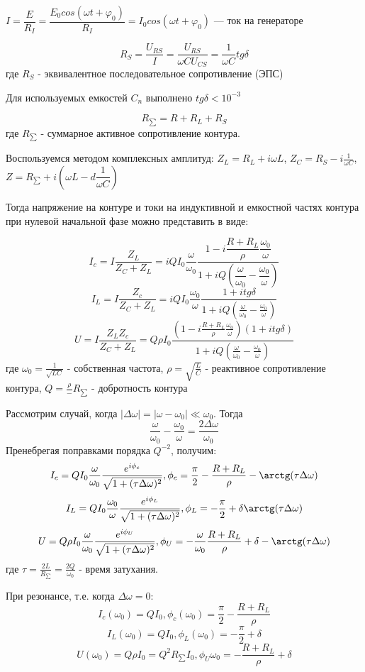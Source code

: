 \documentclass[a4paper, 12pt]{article}
\begin{document}
    $I=\dfrac{E}{R_I}=\dfrac{E_0cos(\omega t+\varphi_0)}{R_I}=I_0cos(\omega t+\varphi_0)$ --- ток на генераторе

    $$R_S=\dfrac{U_{RS}}{I}=\frac{U_{RS}}{\omega CU_{CS}}=\dfrac{1}{\omega C}tg\delta$$
    где $R_S$ - эквивалентное последовательное сопротивление (ЭПС)

    Для используемых емкостей $C_n$ выполнено $tg\delta<10^{-3}$

    $$R_{\sum}=R+R_L+R_S$$
    где $R_{\sum}$ - суммарное активное сопротивление контура.

    Воспользуемся методом комплексных амплитуд:
    $Z_L=R_L+i\omega L$, $Z_C=R_S-i\frac{1}{\omega C}$, $Z=R_{\sum}+i(\omega L-d\dfrac{1}{\omega C})$

    Тогда напряжение на контуре и токи на индуктивной и емкостной частях контура при нулевой начальной фазе можно представить в виде:

    $$I_c=I\dfrac{Z_L}{Z_C+Z_L}=iQI_0\dfrac{\omega}{\omega_0}\dfrac{1-i\dfrac{R+R_L}{\rho}\dfrac{\omega_0}{\omega}}{1+iQ(\dfrac{\omega}{\omega_0}-\dfrac{\omega_0}{\omega})}$$
    $$I_L=I\dfrac{Z_c}{Z_C+Z_L}=iQI_0\frac{\omega_0}{\omega}\frac{1+itg\delta}{1+iQ(\frac{\omega}{\omega_0}-\frac{\omega_0}{\omega})}$$
    $$U=I\frac{Z_LZ_c}{Z_C+Z_L}=Q\rho I_0\frac{(1-i\frac{R+R_L}{\rho}\frac{\omega_0}{\omega})(1+itg\delta)}{1+iQ(\frac{\omega}{\omega_0}-\frac{\omega_0}{\omega})}$$
    где $\omega_0=\frac{1}{\sqrt{LC}}$ - собственная частота, $\rho=\sqrt{\frac{L}{C}}$ - реактивное сопротивление контура, $Q=\frac{\rho} - {R_{\sum}}$ - добротность контура

    Рассмотрим случай, когда $|\Delta\omega|=|\omega-\omega_0|\ll\omega_0$. Тогда $$\frac{\omega}{\omega_0}-\frac{\omega_0}{\omega}=\frac{2\Delta\omega}{\omega_0}$$ Пренебрегая поправками порядка $Q^{-2}$, получим:
    $$I_c=QI_0\frac{\omega}{\omega_0}\frac{e^{i\phi_c}}{\sqrt{1+(\tau\Delta\omega)^2}},    \phi_c=\frac{\pi}{2}-\frac{R+R_L}{\rho}-\arctg(\tau\Delta\omega)$$
    $$I_L=QI_0\frac{\omega_0}{\omega}\frac{e^{i\phi_L}}{\sqrt{1+(\tau\Delta\omega)^2}}, \phi_L=-\frac{\pi}{2}+\delta\arctg(\tau\Delta\omega)$$
    $$U=Q\rho I_0\frac{\omega}{\omega_0}\frac{e^{i\phi_U}}{\sqrt{1+(\tau\Delta\omega)^2}}, \phi_U=-\frac{\omega}{\omega_0}\frac{R+R_L}{\rho}+\delta-\arctg(\tau\Delta\omega)$$
    где $\tau=\frac{2L}{R_{\sum}}=\frac{2Q}{\omega_0}$ - время затухания.

    При резонансе, т.е. когда $\Delta\omega=0$:
    $$I_c(\omega_0)=QI_0, \phi_c(\omega_0)=\frac{\pi}{2}-\frac{R+R_L}{\rho}$$
    $$I_L(\omega_0)=QI_0, \phi_L(\omega_0)=-\frac{\pi}{2}+\delta$$
    $$U(\omega_0)=Q\rho I_0=Q^2R_{\sum}I_0, \phi_U{\omega_0}=-\frac{R+R_L}{\rho}+\delta$$
\end{document}
